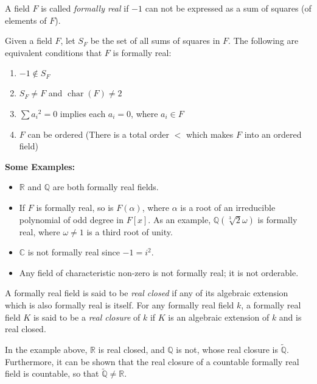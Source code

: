 \documentclass[12pt]{article}
\begin{document}

A field $F$ is called \emph{formally real} if $-1$ can not be expressed as a sum of squares (of elements of $F$).

Given a field $F$, let $S_F$ be the set of all sums of squares in $F$.  The following are equivalent conditions that $F$ is formally real:

\begin{enumerate}
\item
$-1\notin S_F$
\item
$S_F\not= F$ and $\operatorname{char}(F)\ne 2$
\item
$\sum {a_i}^2=0$ implies each $a_i=0$, where $a_i\in F$
\item
$F$ can be ordered (There is a total order $<$ which makes $F$ into an ordered field)
\end{enumerate}

\textbf{Some Examples:}
\begin{itemize}
\item
$\mathbb{R}$ and $\mathbb{Q}$ are both formally real fields.
\item
If $F$ is formally real, so is $F(\alpha)$, where $\alpha$ is a root of an irreducible polynomial of odd degree in $F[x]$.  As an example, $\mathbb{Q}(\sqrt[3]{2}\omega)$ is formally real, where $\omega\not= 1$ is a third root of unity.
\item
$\mathbb{C}$ is not formally real since $-1=i^2$.
\item
Any field of characteristic non-zero is not formally real; it is not  orderable.
\end{itemize}

A formally real field is said to be \emph{real closed} if any of its algebraic extension which is also formally real is itself.  For any formally real field $k$, a formally real field $K$ is said to be a \emph{real closure} of $k$ if $K$ is an algebraic extension of $k$ and is real closed.

In the example above, $\mathbb{R}$ is real closed, and $\mathbb{Q}$ is not, whose real closure is $\tilde{\mathbb{Q}}$.  Furthermore, it can be shown that the real closure of a countable formally real field is countable, so that $\tilde{\mathbb{Q}} \ne \mathbb{R}$.

\end{document}
